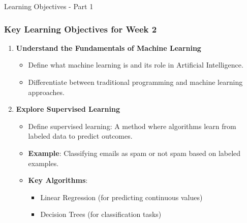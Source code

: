 \documentclass[aspectratio=169]{beamer}
\begin{document}
\begin{frame}[fragile]{Learning Objectives - Part 1}
    \frametitle{Key Learning Objectives for Week 2}
    \begin{enumerate}
        \item \textbf{Understand the Fundamentals of Machine Learning}
        \begin{itemize}
            \item Define what machine learning is and its role in Artificial Intelligence.
            \item Differentiate between traditional programming and machine learning approaches.
        \end{itemize}
        
        \item \textbf{Explore Supervised Learning}
        \begin{itemize}
            \item Define supervised learning: A method where algorithms learn from labeled data to predict outcomes.
            \item \textbf{Example}: Classifying emails as spam or not spam based on labeled examples.
            \item \textbf{Key Algorithms}: 
            \begin{itemize}
                \item Linear Regression (for predicting continuous values)
                \item Decision Trees (for classification tasks)
            \end{itemize}
        \end{itemize}
    \end{enumerate}
\end{frame}
\end{document}
